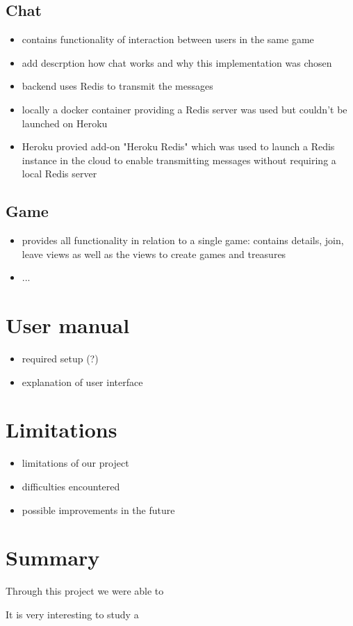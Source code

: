 \documentclass{article}
\begin{document}
\subsection{Chat}
\begin{itemize}
\item contains functionality of interaction between users in the same game
\item add descrption how chat works and why this implementation was chosen
\item backend uses Redis to transmit the messages
\item locally a docker container providing a Redis server was used but couldn't be launched on Heroku
\item Heroku provied add-on "Heroku Redis" which was used to launch a Redis instance in the cloud to enable transmitting messages without requiring a local Redis server
\end{itemize}
\subsection{Game}
\begin{itemize}
\item provides all functionality in relation to a single game: contains details, join, leave views as well as the views to create games and treasures
\item ...
\end{itemize}
\section{User manual}
\begin{itemize}
\item required setup (?)
\item explanation of user interface
\end{itemize}
\newpage

\section{Limitations}
\begin{itemize}
\item limitations of our project
\item difficulties encountered
\item possible improvements in the future
\end{itemize}

\section{Summary}
Through this project we were able to

It is very interesting to study a 
\end{document}
